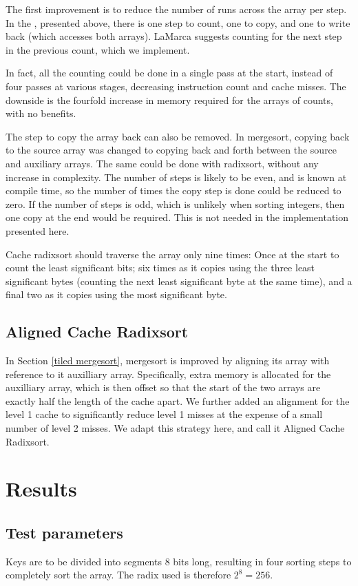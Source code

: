 The first improvement is to reduce the number of runs across the array per
step.  In the , presented above, there is one step to count,
one to copy, and one to write back (which accesses both arrays). LaMarca
suggests counting for the next step in the previous count, which we implement. 

In fact, all the counting could be done in a single pass at the start, instead
of four passes at various stages, decreasing instruction count and cache misses.
The downside is the fourfold increase in memory required for the arrays of
counts, with no benefits.

The step to copy the array back can also be removed. In mergesort, copying back
to the source array was changed to copying back and forth between the source and
auxiliary arrays. The same could be done with radixsort, without any increase in
complexity. The number of steps is likely to be even, and is known at compile
time, so the number of times the copy step is done could be reduced to zero. If
the number of steps is odd, which is unlikely when sorting integers, then one
copy at the end would be required. This is not needed in the implementation
presented here.

Cache radixsort should traverse the array only nine times: Once at the start to
count the least significant bits; six times as it copies using the three least
significant bytes (counting the next least significant byte at the same time),
and a final two as it copies using the most significant byte.


\subsection{Aligned Cache Radixsort}
In Section \ref{tiled mergesort}, mergesort is improved by aligning its array
with reference to it auxilliary array. Specifically, extra memory is allocated
for the auxilliary array, which is then offset so that the start of the two
arrays are exactly half the length of the cache apart. We further added an
alignment for the level 1 cache to significantly reduce level 1 misses at the
expense of a small number of level 2  misses. We adapt this strategy here, and
call it Aligned Cache Radixsort.


\section{Results}
\subsection{Test parameters}
Keys are to be divided into segments 8 bits long, resulting in four sorting
steps to completely sort the array. The radix used is therefore $2^8 = 256$.

